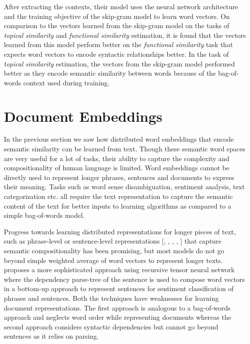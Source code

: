 After extracting the contexts, their model uses the neural network architecture and the training objective of the skip-gram model to learn word vectors. On comparison to the vectors learned from the skip-gram model on the tasks of \emph{topical similarity} and \emph{functional similarity} estimation, it is found that the vectors learned from this model perform better on the \emph{functional similarity} task that expects word vectors to encode syntactic relationships better. In the task of \emph{topical similarity} estimation, the vectors from the skip-gram model performed better as they encode semantic similarity between words because of the bag-of-words context used during training.

\section{Document Embeddings}
\label{sec:document_embeddings}
In the previous section we saw how distributed word embeddings that encode semantic similarity can be learned from text. 
Though these semantic word spaces are very useful for a lot of tasks, their ability to capture the complexity and compositionality of human language is limited. 
Word embeddings cannot be directly used to represent longer phrases, sentences and documents to express their meaning. 
Tasks such as word sense disambiguation, sentiment analysis, text categorization etc. all require the text representation to capture the semantic content of the text for better inputs to learning algorithms as compared to a simple bag-of-words model. 

Progress towards learning distributed representations for longer pieces of text, such as phrase-level or sentence-level representations [\cite{mitchell2010composition}, \cite{zanzotto2010estimating}, \cite{yessenalina2011compositional}, \cite{grefenstette2013multi}, \cite{mikolov2013distributed}] that capture semantic compositionality has been promising, but most models do not go beyond simple weighted average of word vectors to represent longer texts. 
\cite{socher2013recursive} proposes a more sophisticated approach using recursive tensor neural network where the dependency parse-tree of the sentence is used to compose word vectors in a bottom-up approach to represent sentences for sentiment classification of phrases and sentences. 
Both the techniques have weaknesses for learning document representations. The first approach is analogous to a bag-of-words approach and neglects word order while representing documents whereas the second approach considers syntactic dependencies but cannot go beyond sentences as it relies on parsing.

